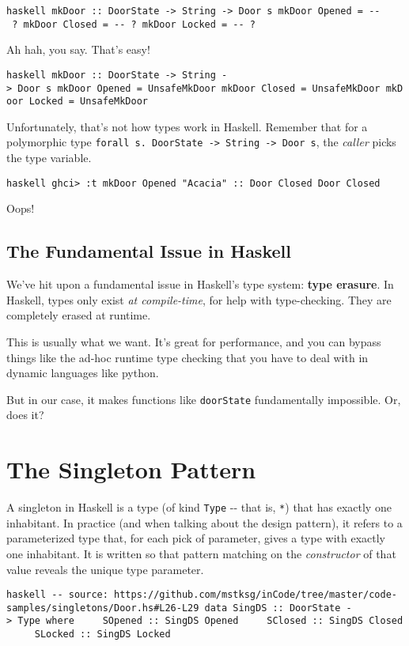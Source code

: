 \documentclass[]{article}
\begin{document}
\texttt{haskell\ mkDoor\ ::\ DoorState\ -\textgreater{}\ String\ -\textgreater{}\ Door\ s\ mkDoor\ Opened\ =\ -\/-\ ?\ mkDoor\ Closed\ =\ -\/-\ ?\ mkDoor\ Locked\ =\ -\/-\ ?}

Ah hah, you say. That's easy!

\texttt{haskell\ mkDoor\ ::\ DoorState\ -\textgreater{}\ String\ -\textgreater{}\ Door\ s\ mkDoor\ Opened\ =\ UnsafeMkDoor\ mkDoor\ Closed\ =\ UnsafeMkDoor\ mkDoor\ Locked\ =\ UnsafeMkDoor}

Unfortunately, that's not how types work in Haskell. Remember that for a
polymorphic type
\texttt{forall\ s.\ DoorState\ -\textgreater{}\ String\ -\textgreater{}\ Door\ s},
the \emph{caller} picks the type variable.

\texttt{haskell\ ghci\textgreater{}\ :t\ mkDoor\ Opened\ "Acacia"\ ::\ Door\ \textquotesingle{}Closed\ Door\ \textquotesingle{}Closed}

Oops!

\subsection{The Fundamental Issue in Haskell}

We've hit upon a fundamental issue in Haskell's type system: \textbf{type
erasure}. In Haskell, types only exist \emph{at compile-time}, for help with
type-checking. They are completely erased at runtime.

This is usually what we want. It's great for performance, and you can bypass
things like the ad-hoc runtime type checking that you have to deal with in
dynamic languages like python.

But in our case, it makes functions like \texttt{doorState} fundamentally
impossible. Or, does it?

\section{The Singleton Pattern}

A singleton in Haskell is a type (of kind \texttt{Type} -\/- that is,
\texttt{*}) that has exactly one inhabitant. In practice (and when talking about
the design pattern), it refers to a parameterized type that, for each pick of
parameter, gives a type with exactly one inhabitant. It is written so that
pattern matching on the \emph{constructor} of that value reveals the unique type
parameter.

\texttt{haskell\ -\/-\ source:\ https://github.com/mstksg/inCode/tree/master/code-samples/singletons/Door.hs\#L26-L29\ data\ SingDS\ ::\ DoorState\ -\textgreater{}\ Type\ where\ \ \ \ \ SOpened\ ::\ SingDS\ \textquotesingle{}Opened\ \ \ \ \ SClosed\ ::\ SingDS\ \textquotesingle{}Closed\ \ \ \ \ SLocked\ ::\ SingDS\ \textquotesingle{}Locked}
\end{document}

